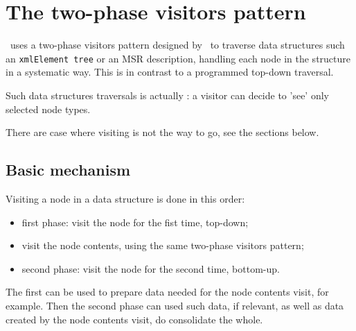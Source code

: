 



\chapter{The two-phase visitors pattern}\label{The two-phase visitors pattern}

\mf\ uses a two-phase visitors pattern designed by \fober\ to traverse data structures such an {\tt xmlElement tree} or an MSR description, handling each node in the structure in a systematic way. This is in contrast to a programmed top-down traversal.

Such data structures traversals is actually : a visitor can decide to 'see' only selected node types.

There are case where visiting is not the way to go, see the sections below.


\section{Basic mechanism}

Visiting a node in a data structure is done in this order:
\begin{itemize}
\item first phase: visit the node for the fist time, top-down;
\item visit the node contents, using the same two-phase visitors pattern;
\item second phase: visit the node for the second time, bottom-up.
\end{itemize}

The first can be used to prepare data needed for the node contents visit, for example.
Then the second phase can used such data, if relevant, as well as data created by the node contents visit, do consolidate the whole.

